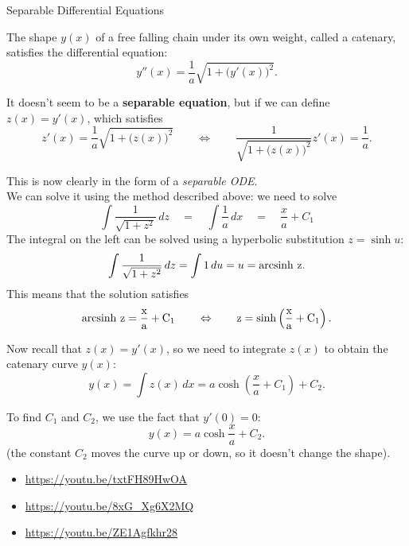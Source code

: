 \begin{submodule}{Separable Differential Equations}
\def\arcsinh{\rm arcsinh\ }
\begin{example}
The shape $y(x)$ of a free falling chain under its own weight, called a catenary, satisfies the differential equation:
$$
y''(x) = \frac1a \sqrt{1+\big(y'(x)\big)^2}.
$$

It doesn't seem to be a \textbf{\color{Red!70!black}separable equation}, but if we can define $z(x) = y'(x)$, which satisfies
$$
z'(x) = \frac1a \sqrt{1+\big(z(x)\big)^2}
\qquad \Leftrightarrow \qquad \frac{1}{\sqrt{1+\big(z(x)\big)^2}} z'(x) = \frac1a.
$$

This is now clearly in the form of a \emph{\color{Red!70!black}separable ODE}. \\

We can solve it using the method described above: we need to solve
$$
\int \frac{1}{\sqrt{1+z^2}}\,dz \quad = \quad \int \frac1a \,dx \quad = \quad \frac{x}{a} + C_1
$$
The integral on the left can be solved using a hyperbolic substitution $z = \sinh u$:
$$
\int \frac{1}{\sqrt{1+z^2}}\,dz = \int 1 \, du = u = \arcsinh z.
$$
This means that the solution satisfies
$$
\arcsinh z = \frac{x}{a} + C_1 
\qquad \Leftrightarrow \qquad z = \sinh \left(\frac{x}{a} + C_1 \right).
$$

Now recall that $z(x) = y'(x)$, so we need to integrate $z(x)$ to obtain the catenary curve $y(x)$:
$$
y(x) = \int z(x) \, dx = a \cosh \left(\frac{x}{a} + C_1\right) + C_2.
$$

To find $C_1$ and $C_2$, we use the fact that $y'(0)=0$:
$$
y(x) = a \cosh \frac{x}{a}  + C_2.
$$
(the constant $C_2$ moves the curve up or down, so it doesn't change the shape).
\end{example}


\begin{video}
\begin{itemize}
	\item \href{https://youtu.be/txtFH89HwOA}{https://youtu.be/txtFH89HwOA} \hfill {}
	\item \href{https://youtu.be/8xG_Xg6X2MQ}{https://youtu.be/8xG\_Xg6X2MQ} \hfill {}
	\item \href{https://youtu.be/ZE1Agfkhr28}{https://youtu.be/ZE1Agfkhr28} \hfill {}
\end{itemize}	
\end{video}

\end{submodule}

\hfill \\

